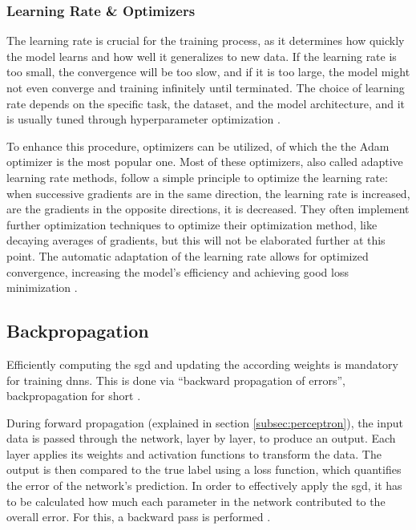 \subsubsection*{Learning Rate \& Optimizers}

The learning rate is crucial for the training process, as it determines how quickly the model learns and how well it generalizes to new data. If the learning rate is too small, the convergence will be too slow, and if it is too large, the model might not even converge and training infinitely until terminated. The choice of learning rate depends on the specific task, the dataset, and the model architecture, and it is usually tuned through hyperparameter optimization \autocite{Bernard2021,Szeliski2022}.

To enhance this procedure, optimizers can be utilized, of which the the Adam optimizer \autocite{Kingma.Ba2015} is the most popular one. Most of these optimizers, also called adaptive learning rate methods, follow a simple principle to optimize the learning rate: when successive gradients are in the same direction, the learning rate is increased, are the gradients in the opposite directions, it is decreased. They often implement further optimization techniques to optimize their optimization method, like decaying averages of gradients, but this will not be elaborated further at this point. The automatic adaptation of the learning rate allows for optimized convergence, increasing the model's efficiency and achieving good loss minimization \autocite{Bernard2021,Kingma.Ba2015,Szeliski2022,Zhang.Lipton.ea2023}.

\subsection{Backpropagation}

Efficiently computing the \gls{sgd} and updating the according weights is mandatory for training \glspl{dnn}. This is done via \enquote{backward propagation of errors}, backpropagation for short \autocite{Szeliski2022}.

During forward propagation (explained in section \ref{subsec:perceptron}), the input data is passed through the network, layer by layer, to produce an output. Each layer applies its weights and activation functions to transform the data. The output is then compared to the true label using a loss function, which quantifies the error of the network's prediction. In order to effectively apply the \gls{sgd}, it has to be calculated how much each parameter in the network contributed to the overall error. For this, a backward pass is performed \autocite{Goodfellow.Bengio.ea2016,Szeliski2022,Zhang.Lipton.ea2023}.

